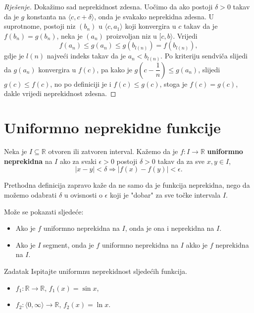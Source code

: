 \begin{proof}[Rješenje]
Dokažimo sad neprekidnost zdesna. Uočimo da ako postoji $\delta>0$ takav da je $g$ konstanta na $\langle c, c+\delta\rangle$, onda je svakako neprekidna zdesna. U suprotnome, postoji niz $(b_n)$ u $\langle c, a_1\rangle$ koji konvergira u $c$ takav da je $f(b_n)=g(b_n)$, neka je $(a_n)$ proizvoljan niz u $[c, b\rangle$. Vrijedi
$$f(a_n)\leq g(a_n)\leq g(b_{l(n)})=f(b_{l(n)}),$$
gdje je $l(n)$ najveći indeks takav da je $a_n<b_{l(n)}$.
Po kriteriju sendviča slijedi da $g(a_n)$ konvergira u $f(c)$, pa kako je $g\left(c-\dfrac{1}{n}\right)\leq g(a_n)$, slijedi $g(c)\leq f(c)$, no po definiciji je i $f(c)\leq g(c)$, stoga je $f(c)=g(c)$, dakle vrijedi neprekidnost zdesna.
\end{proof}
\section{Uniformno neprekidne funkcije}
\begin{definition}
Neka je \(I\subseteq \mathbb{R}\) otvoren ili zatvoren interval. Kažemo da je \(f : I\to \mathbb{R}\) \textbf{uniformno neprekidna} na \(I\) ako za svaki \(\epsilon>0\) postoji \(\delta>0\) takav da za sve \(x, y\in I\),
\[|x-y|<\delta \Rightarrow |f(x)-f(y)|<\epsilon.\]
\end{definition}
Prethodna definicija zapravo kaže da ne samo da je funkcija neprekidna, nego da možemo odabrati \(\delta\) u ovisnosti o \(\epsilon\) koji je "dobar" za sve točke intervala \(I\).
\begin{remark}
Može se pokazati sljedeće: 
\begin{itemize}
\item[a)] Ako je \(f\) uniformno neprekidna na \(I\), onda je ona i neprekidna na \(I\).
\item[b)]Ako je \(I\) segment, onda je \(f\) uniformno neprekidna na \(I\) akko je \(f\) neprekidna na \(I\).
\end{itemize}
\end{remark}
\begin{exercise}{Zadatak} Ispitajte uniformnu neprekidnost sljedećih funkcija.
\begin{itemize}
\item[a)] \(f_1 : \mathbb{R}\to \mathbb{R}\), \(f_1(x)=\sin{x}\),
\item[b)] \(f_2 : \langle 0, \infty\rangle\to \mathbb{R}\), \(f_2(x)=\ln{x}\). 
\end{itemize}
\end{exercise}

